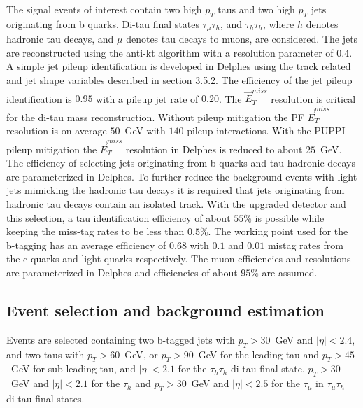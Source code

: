 The signal events of interest contain two high $p_{T}$ taus and two high $p_{T}$ jets originating from b quarks. Di-tau final states $\tau_{\mu}\tau_{h}$, and $\tau_{h}\tau_{h}$, where $h$ denotes hadronic tau decays, and $\mu$ denotes tau decays to muons, are considered. The jets are reconstructed using the anti-kt algorithm with a resolution parameter of $0.4$. A simple jet pileup identification is developed in Delphes using the track related and jet shape variables described in section 3.5.2. The efficiency of the jet pileup identification is $0.95$ with a pileup jet rate of $0.20$. The $\vec{E}_{T}^{miss}$ resolution is critical for the di-tau mass reconstruction. Without pileup mitigation the PF $\vec{E}_{T}^{miss}$ resolution is on average $50$~GeV with $140$ pileup interactions. With the PUPPI pileup mitigation the $\vec{E}_{T}^{miss}$ resolution in Delphes is reduced to about $25$~GeV.  The efficiency of selecting jets originating from b quarks and tau hadronic decays are parameterized in Delphes. To further reduce the background events with light jets mimicking the hadronic tau decays it is required that jets originating from hadronic tau decays contain an isolated track. With the upgraded \phasetwo detector and this selection, a tau identification efficiency of about $55\%$ is possible while keeping the miss-tag rates to be less than $0.5\%$. The working point used for the b-tagging has an average efficiency of $0.68$ with $0.1$ and $0.01$ mistag rates from the c-quarks and light quarks respectively.  The muon efficiencies and resolutions are parameterized in Delphes and efficiencies of about $95\%$ are assumed.

\subsection{Event selection and background estimation}
Events are selected containing two b-tagged jets with $p_{T}>30$~GeV
and $|\eta|<2.4$, and two taus with $p_{T}>60$~GeV, or $p_{T}>90$~GeV
for the leading tau and $p_{T}>45$~GeV for sub-leading tau, and
$|\eta|<2.1$ for the $\tau_{h}\tau_{h}$ di-tau final state, $p_{T}>30$~GeV
and $|\eta|<2.1$  for the $\tau_{h}$ and $p_{T}>30$~GeV and $|\eta|<2.5$
for the $\tau_{\mu}$ in $\tau_{\mu}\tau_{h}$ di-tau final states. 

